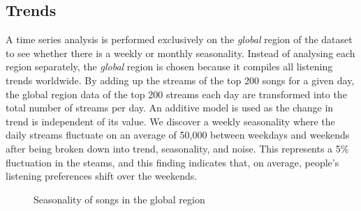 \subsection{Trends}
A time series analysis is performed exclusively on the  \textit{global} region of the dataset to see whether there is a weekly or monthly seasonality. Instead of analysing each region separately, the \textit{global} region is chosen because it compiles all listening trends worldwide. By adding up the streams of the top 200 songs for a given day, the global region data of the top 200 streams each day are transformed into the total number of streams per day. An additive model is used as the change in trend is independent of its value. We discover a weekly seasonality where the daily streams fluctuate on an average of 50,000 between weekdays and weekends after being broken down into trend, seasonality, and noise. This represents a 5\% fluctuation in the steams, and this finding indicates that, on average, people's listening preferences shift over the weekends.
\begin{figure}[h]
\centering
{}
\caption{Seasonality of songs in the global region}
\end{figure}